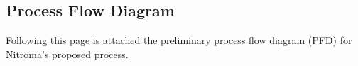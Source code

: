 \begin{landscape}


\section{Process Flow Diagram}
\label{app:PFD}

Following this page is attached the preliminary process flow diagram (PFD) for Nitroma's proposed process.



\end{landscape}